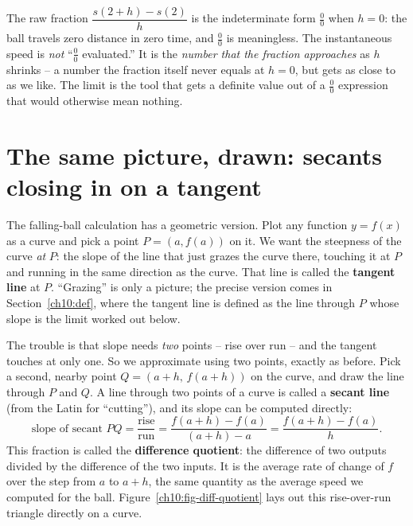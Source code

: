 \begin{happeningbox}
The raw fraction
$\dfrac{s(2+h) - s(2)}{h}$ is the indeterminate form $\frac{0}{0}$ when $h = 0$:
the ball travels zero distance in zero time, and $\frac{0}{0}$ is meaningless. The
instantaneous speed is \emph{not} ``$\frac{0}{0}$ evaluated.'' It is the
\emph{number that the fraction approaches} as $h$ shrinks -- a number the fraction
itself never equals at $h=0$, but gets as close to as we like. The limit is
the tool that gets a definite value out of a $\frac{0}{0}$ expression that would
otherwise mean nothing.
\end{happeningbox}

\section{The same picture, drawn: secants closing in on a tangent}
\label{ch10:secant-tangent}

The falling-ball calculation has a geometric version. Plot any function
$y = f(x)$ as a curve and pick a point $P = (a, f(a))$ on it. We want the
steepness of the curve \emph{at} $P$: the slope of the line that just grazes the
curve there, touching it at $P$ and running in the same direction as the curve.
That line is called the \textbf{tangent line} at $P$. ``Grazing'' is only a
picture; the precise version comes in Section~\ref{ch10:def}, where the tangent
line is defined as the line through $P$ whose slope is the limit worked out below.

The trouble is that slope needs \emph{two} points -- rise over run -- and the
tangent touches at only one. So we approximate using two points, exactly as before. Pick a second,
nearby point $Q = (a + h,\, f(a + h))$ on the curve, and draw the line through
$P$ and $Q$. A line through two points of a curve is called a \textbf{secant
line} (from the Latin for ``cutting''), and its slope can be computed directly:
\[
  \text{slope of secant } PQ
  = \frac{\text{rise}}{\text{run}}
  = \frac{f(a + h) - f(a)}{(a + h) - a}
  = \frac{f(a + h) - f(a)}{h}.
\]
This fraction is called the \textbf{difference quotient}: the difference of two
outputs divided by the difference of the two inputs. It is the average rate of
change of $f$ over the step from $a$ to $a + h$, the same quantity as the
average speed we computed for the ball. Figure~\ref{ch10:fig-diff-quotient} lays out this
rise-over-run triangle directly on a curve.

